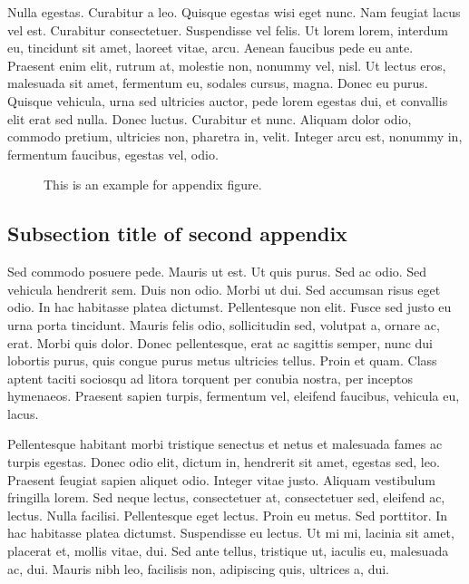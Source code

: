 \documentclass[AMA]{WileyNJD-v1}
\begin{document}
Nulla egestas. Curabitur a leo. Quisque egestas wisi eget nunc. Nam feugiat lacus vel est. Curabitur consectetuer.
Suspendisse vel felis. Ut lorem lorem, interdum eu, tincidunt sit amet, laoreet vitae, arcu. Aenean faucibus pede eu
ante. Praesent enim elit, rutrum at, molestie non, nonummy vel, nisl. Ut lectus eros, malesuada sit amet, fermentum
eu, sodales cursus, magna. Donec eu purus. Quisque vehicula, urna sed ultricies auctor, pede lorem egestas dui, et
convallis elit erat sed nulla. Donec luctus. Curabitur et nunc. Aliquam dolor odio, commodo pretium, ultricies non,
pharetra in, velit. Integer arcu est, nonummy in, fermentum faucibus, egestas vel, odio.

\begin{figure}[t]
\caption{This is an example for appendix figure.\label{fig5}}
\end{figure}

\subsection{Subsection title of second appendix\label{app2.1a}}

Sed commodo posuere pede. Mauris ut est. Ut quis purus. Sed ac odio. Sed vehicula hendrerit sem. Duis non odio.
Morbi ut dui. Sed accumsan risus eget odio. In hac habitasse platea dictumst. Pellentesque non elit. Fusce sed justo
eu urna porta tincidunt. Mauris felis odio, sollicitudin sed, volutpat a, ornare ac, erat. Morbi quis dolor. Donec
pellentesque, erat ac sagittis semper, nunc dui lobortis purus, quis congue purus metus ultricies tellus. Proin et quam.
Class aptent taciti sociosqu ad litora torquent per conubia nostra, per inceptos hymenaeos. Praesent sapien turpis,
fermentum vel, eleifend faucibus, vehicula eu, lacus.

Pellentesque habitant morbi tristique senectus et netus et malesuada fames ac turpis egestas. Donec odio elit,
dictum in, hendrerit sit amet, egestas sed, leo. Praesent feugiat sapien aliquet odio. Integer vitae justo. Aliquam
vestibulum fringilla lorem. Sed neque lectus, consectetuer at, consectetuer sed, eleifend ac, lectus. Nulla facilisi.
Pellentesque eget lectus. Proin eu metus. Sed porttitor. In hac habitasse platea dictumst. Suspendisse eu lectus. Ut
mi mi, lacinia sit amet, placerat et, mollis vitae, dui. Sed ante tellus, tristique ut, iaculis eu, malesuada ac, dui.
Mauris nibh leo, facilisis non, adipiscing quis, ultrices a, dui.
\end{document}
